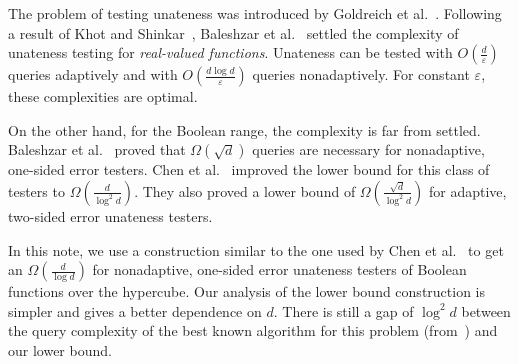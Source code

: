 \documentclass[11pt]{article}
\newcommand{\eps}{\varepsilon}
\begin{document}
The problem of testing unateness was introduced by Goldreich et al.~\cite{GGLRS00}. 
Following a result of Khot and Shinkar~\cite{KS16}, Baleshzar et al.~\cite{BCPRS17} settled the complexity
of unateness testing for \emph{real-valued functions}. 
Unateness can be tested with $O(\frac{d}{\eps})$ queries adaptively and with $O(\frac{d \log d}{\eps})$ queries nonadaptively.
For constant $\eps$, these complexities are optimal.

On the other hand, for the Boolean range, the complexity is far from settled.
Baleshzar et al.~\cite{BMPR16} proved that $\Omega(\sqrt{d})$ queries are necessary for nonadaptive, one-sided error testers. Chen et al.~\cite{CWX17} improved the lower bound for this class of testers to $\Omega(\frac{d}{\log^2 d})$.
They also proved a lower bound of $\Omega(\frac{\sqrt{d}}{\log^2 d})$ for adaptive, two-sided error unateness testers.

In this note, we use a construction similar to the one used by Chen et al.~\cite{CWX17} to get an $\Omega(\frac{d}{\log d})$ for nonadaptive, one-sided error unateness testers of Boolean functions over the hypercube. 
Our analysis of the lower bound construction is simpler and gives a better dependence on $d$.
There is still a gap of $\log^2d$ between the query complexity of the best known algorithm for this problem (from~\cite{BCPRS17}) and our lower bound.
\end{document}
